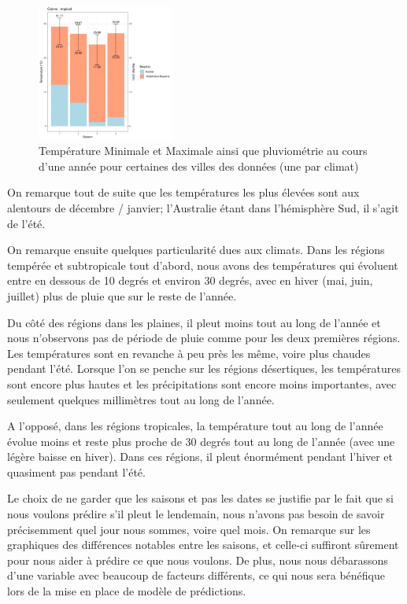 \documentclass{article}
\begin{document}
\begin{figure}[p]
        \includegraphics[page=1,width=0.4\textwidth]{Images/Temp_and_Rainfalltropical.pdf}
    \caption{Température Minimale et Maximale ainsi que pluviométrie au cours d'une année pour certaines des villes des données (une par climat)}
    \label{fig:temp_and_rainfall}
\end{figure}

On remarque tout de suite que les températures les plus élevées sont aux alentours de décembre / janvier; l'Australie étant dans l'hémisphère Sud, il s'agit de l'été. 

On remarque ensuite quelques particularité dues aux climats. Dans les régions tempérée et subtropicale tout d'abord, nous avons des températures qui évoluent entre en dessous de 10 degrés et environ 30 degrés, avec en hiver (mai, juin, juillet) plus de pluie que sur le reste de l'année.

Du côté des régions dans les plaines, il pleut moins tout au long de l'année et nous n'observons pas de période de pluie comme pour les deux premières régions. Les températures sont en revanche à peu près les même, voire plus chaudes pendant l'été. Lorsque l'on se penche sur les régions désertiques, les températures sont encore plus hautes et les précipitations sont encore moins importantes, avec seulement quelques millimètres tout au long de l'année. 

A l'opposé, dans les régions tropicales, la température tout au long de l'année évolue moins et reste plus proche de 30 degrés tout au long de l'année (avec une légère baisse en hiver). Dans ces régions, il pleut énormément pendant l'hiver et quasiment pas pendant l'été.

Le choix de ne garder que les saisons et pas les dates se justifie par le fait que si nous voulons prédire s'il pleut le lendemain, nous n'avons pas besoin de savoir précisemment quel jour nous sommes, voire quel mois. On remarque sur les graphiques des différences notables entre les saisons, et celle-ci suffiront sûrement pour nous aider à prédire ce que nous voulons. De plus, nous nous débarassons d'une variable avec beaucoup de facteurs différents, ce qui nous sera bénéfique lors de la mise en place de modèle de prédictions.
\end{document}
